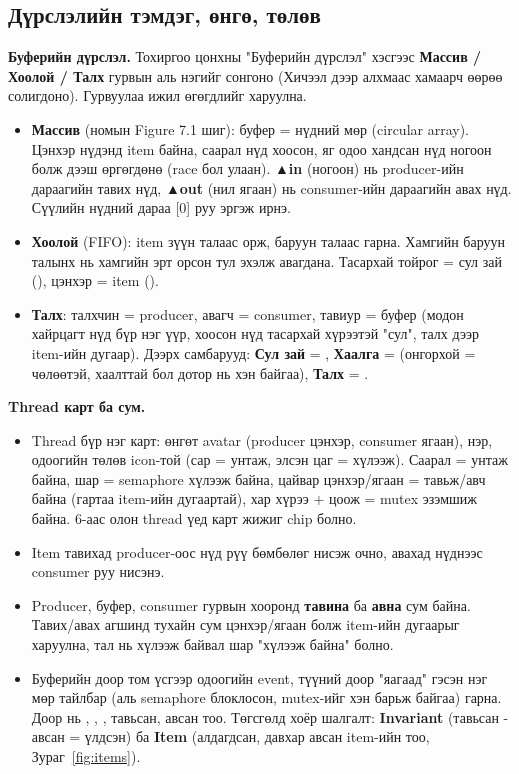\documentclass[12pt,a4paper]{article}
\begin{document}
\subsection{Дүрслэлийн тэмдэг, өнгө, төлөв}
\textbf{Буферийн дүрслэл.} Тохиргоо цонхны "Буферийн дүрслэл" хэсгээс \textbf{Массив / Хоолой / Талх} гурвын аль нэгийг сонгоно (Хичээл дээр алхмаас хамаарч өөрөө солигдоно). Гурвуулаа ижил өгөгдлийг харуулна.
\begin{itemize}
  \item \textbf{Массив} (номын Figure 7.1 шиг): буфер = нүдний мөр (circular array). Цэнхэр нүдэнд item байна, саарал нүд хоосон, яг одоо хандсан нүд ногоон болж дээш өргөгдөнө (race бол улаан). \textbf{▲in} (ногоон) нь producer-ийн дараагийн тавих нүд, \textbf{▲out} (нил ягаан) нь consumer-ийн дараагийн авах нүд. Сүүлийн нүдний дараа [0] руу эргэж ирнэ.
  \item \textbf{Хоолой} (FIFO): item зүүн талаас орж, баруун талаас гарна. Хамгийн баруун талынх нь хамгийн эрт орсон тул эхэлж авагдана. Тасархай тойрог = сул зай (), цэнхэр = item ().
  \item \textbf{Талх}: талхчин = producer, авагч = consumer, тавиур = буфер (модон хайрцагт нүд бүр нэг үүр, хоосон нүд тасархай хүрээтэй "сул", талх дээр item-ийн дугаар). Дээрх самбарууд: \textbf{Сул зай} = , \textbf{Хаалга} =  (онгорхой = чөлөөтэй, хаалттай бол дотор нь хэн байгаа), \textbf{Талх} = .
\end{itemize}

\textbf{Thread карт ба сум.}
\begin{itemize}
  \item Thread бүр нэг карт: өнгөт avatar (producer цэнхэр, consumer ягаан), нэр, одоогийн төлөв icon-той (сар = унтаж, элсэн цаг = хүлээж). Саарал = унтаж байна, шар = semaphore хүлээж байна, цайвар цэнхэр/ягаан = тавьж/авч байна (гартаа item-ийн дугаартай), хар хүрээ + цоож = mutex эзэмшиж байна. 6-аас олон thread үед карт жижиг chip болно.
  \item Item тавихад producer-оос нүд рүү бөмбөлөг нисэж очно, авахад нүднээс consumer руу нисэнэ.
  \item Producer, буфер, consumer гурвын хооронд \textbf{тавина} ба \textbf{авна} сум байна. Тавих/авах агшинд тухайн сум цэнхэр/ягаан болж item-ийн дугаарыг харуулна, тал нь хүлээж байвал шар "хүлээж байна" болно.
  \item Буферийн доор том үсгээр одоогийн event, түүний доор "яагаад" гэсэн нэг мөр тайлбар (аль semaphore блоклосон, mutex-ийг хэн барьж байгаа) гарна. Доор нь , , , тавьсан, авсан тоо. Төгсгөлд хоёр шалгалт: \textbf{Invariant} (тавьсан - авсан = үлдсэн) ба \textbf{Item} (алдагдсан, давхар авсан item-ийн тоо, Зураг~\ref{fig:items}).
\end{itemize}
\end{document}
